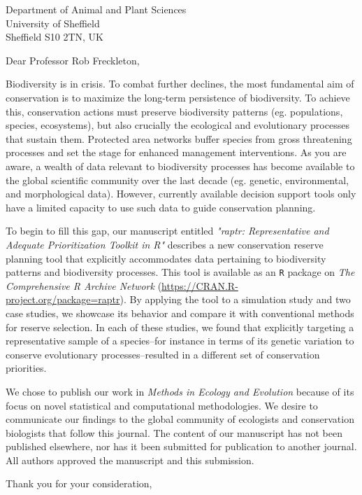 \documentclass{letter}
\begin{document}
\begin{letter}{Department of Animal and Plant Sciences\\University of Sheffield\\Sheffield S10 2TN, UK}
\opening{Dear Professor Rob Freckleton,}

Biodiversity is in crisis. To combat further declines, the most fundamental aim of conservation is to maximize the long-term persistence of biodiversity. To achieve this, conservation actions must preserve biodiversity patterns (eg. populations, species, ecosystems), but also crucially the ecological and evolutionary processes that sustain them. Protected area networks buffer species from gross threatening processes and set the stage for enhanced management interventions. As you are aware, a wealth of data relevant to biodiversity processes has become available to the global scientific community over the last decade (eg. genetic, environmental, and morphological data). However, currently available decision support tools only have a limited capacity to use such data to guide conservation planning.

To begin to fill this gap, our manuscript entitled \textit{"raptr: Representative and Adequate Prioritization Toolkit in R"} describes a new conservation reserve planning tool that explicitly accommodates data pertaining to biodiversity patterns and biodiversity processes. This tool is available as an \texttt{R} package on \textit{The Comprehensive R Archive Network} (\url{https://CRAN.R-project.org/package=raptr}). By applying the tool to a simulation study and two case studies, we showcase its behavior and compare it with conventional methods for reserve selection. In each of these studies, we found that explicitly targeting a representative sample of a species--for instance in terms of its genetic variation to conserve evolutionary processes--resulted in a different set of conservation priorities.

We chose to publish our work in \textit{Methods in Ecology and Evolution} because of its focus on novel statistical and computational methodologies. We desire to communicate our findings to the global community of ecologists and conservation biologists that follow this journal. The content of our manuscript has not been published elsewhere, nor has it been submitted for publication to another journal. All authors approved the manuscript and this submission.

\closing{Thank you for your consideration,}

\end{letter}
\end{document}
